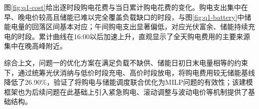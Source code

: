 图\ref{fig:q1-cost}给出逐时段购电花费与当日累计购电花费的变化。购电支出集中在早、晚电价较高且储能已难以完全覆盖负载缺口的时段，与图\ref{fig:q1-battery}中储能电量的回落区间基本对应；午间购电支出显著偏低，对应光伏富余、储能持续充电的时段。累计曲线在16:00以后加速上升，直观显示了全天购电费用的主要来源集中在晚高峰附近。

综合上文，问题一的优化方案在满足负载不缺供、储能日初日末电量相等的约束下，通过统筹光伏消纳与低价时段充电、高价时段放电，将购电费用较无储能基线降低了26.90\%，验证了将购电与储能调度联合优化为MILP问题的有效性；该建模框架也为后续问题在此基础上引入紧急购电、滚动调整与波动电价等机制提供了基础结构。
